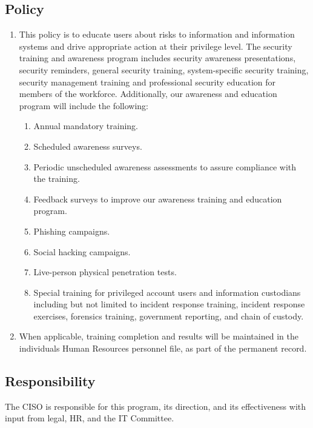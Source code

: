 \documentclass[../main.tex]{subfiles}
\begin{document}
\subsection{Policy}
\begin{enumerate}
    \item This policy is to educate users about risks to information and information systems and drive appropriate action at their privilege level.
    The \CompanyName{} security training and awareness program includes security awareness presentations, security reminders, general security training, system-specific security training,
    security management training and professional security education for members of the workforce. Additionally, our awareness and education program will include the following:
    \begin{enumerate}
        \item Annual mandatory training.
        \item Scheduled awareness surveys.
        \item Periodic unscheduled awareness assessments to assure compliance with the training.
        \item Feedback surveys to improve our awareness training and education program.
        \item Phishing campaigns.
        \item Social hacking campaigns.
        \item Live-person physical penetration tests.
        \item Special training for privileged account users and information custodians including but not limited to incident response training, incident response exercises,
        forensics training, government reporting, and chain of custody.
    \end{enumerate}
    \item When applicable, training completion and results will be maintained in the individuals Human Resources personnel file, as part of the permanent record.
\end{enumerate}
\subsection{Responsibility}
The CISO is responsible for this program, its direction, and its effectiveness with input from legal, HR, and the IT Committee.
\end{document}
